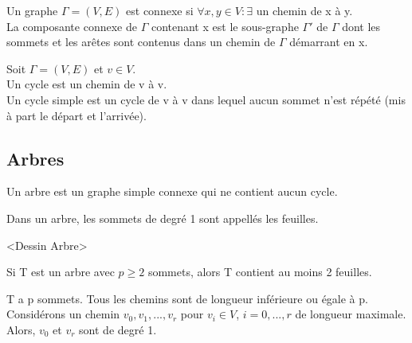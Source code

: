 \begin{defn}
Un graphe $\Gamma = (V,E)$ est connexe si $\forall x,y \in V : \exists $ un chemin de x à y. \\

La composante connexe de $\Gamma$ contenant x est le sous-graphe ${\Gamma}'$ de $\Gamma$ dont les sommets et les arêtes sont contenus dans un chemin de $\Gamma$ démarrant en x. \\
\end{defn}

\begin{defn}
Soit $\Gamma = (V,E)$ et $v \in V$.\\

Un cycle est un chemin de v à v.\\

Un cycle simple est un cycle de v à v dans lequel aucun sommet n'est répété (mis à part le départ et l'arrivée).\\
\end{defn}


\subsection{Arbres}

\begin{defn}
Un arbre est un graphe simple connexe qui ne contient aucun cycle.\\
\end{defn}

\begin{defn}
Dans un arbre, les sommets de degré 1 sont appellés les feuilles.\\
\end{defn}

\begin{exmp}
<Dessin Arbre>
\end{exmp}

\begin{prop}
Si T est un arbre avec $p\geq2$ sommets, alors T contient au moins 2 feuilles.
\end{prop}

\begin{demo}
T a p sommets. Tous les chemins sont de longueur inférieure ou égale à p. Considérons un chemin $v_{0},v_{1},...,v_{r}$ pour $v_{i} \in V$, $i=0,...,r$ de longueur maximale. Alors, $v_{0}$ et $v_{r}$ sont de degré 1.\\
\end{demo}

